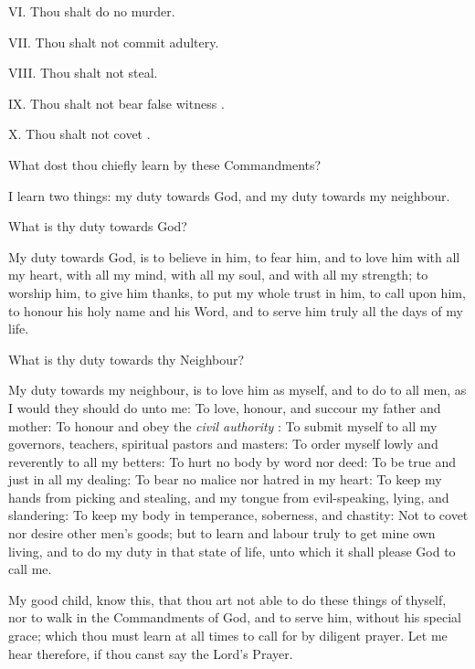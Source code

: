 VI. Thou shalt do no murder.

VII. Thou shalt not commit adultery.

VIII. Thou shalt not steal.

IX. Thou shalt not bear false witness%
.

X. Thou shalt not covet%
.

\medskip
\centerline{}
What dost thou chiefly learn by these Commandments?

 I learn two things: my duty towards God, and my duty towards my neighbour.

 What is thy duty towards God?

 My duty towards God, is to believe in him, to fear him, and to love him with all my heart, with all my mind, with all my soul, and with all my strength; to worship him, to give him thanks, to put my whole trust in him, to call upon him, to honour his holy name and his Word, and to serve him truly all the days of my life.

 What is thy duty towards thy Neighbour?

 My duty towards my neighbour, is to love him as myself, and to do to all men, as I would they should do unto me: To love, honour, and succour my father and mother: To honour and obey the \emph{civil authority}%
: To submit myself to all my governors, teachers, spiritual pastors and masters: To order myself lowly and reverently to all my betters: To hurt no body by word nor deed: To be true and just in all my dealing: To bear no malice nor hatred in my heart: To keep my hands from picking and stealing, and my tongue from evil-speaking, lying, and slandering: To keep my body in temperance, soberness, and chastity: Not to covet nor desire other men’s goods; but to learn and labour truly to get mine own living, and to do my duty in that state of life, unto which it shall please God to call me.

\medskip
\centerline{}
My good child, know this, that thou art not able to do these things of thyself, nor to walk in the Commandments of God, and to serve him, without his special grace; which thou must learn at all times to call for by diligent prayer. Let me hear therefore, if thou canst say the Lord’s Prayer.

